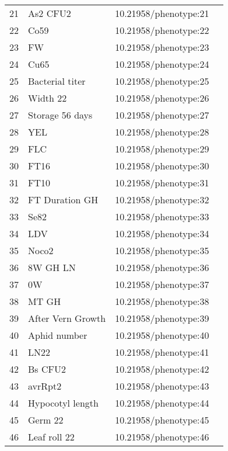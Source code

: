 \begin{longtable}{p{} p{} p{} p{}}
 21 & As2 CFU2 & 10.21958/phenotype:21 & \cite{atwell2010}\\
 22 & Co59 & 10.21958/phenotype:22 & \cite{atwell2010}\\
 23 & FW & 10.21958/phenotype:23 & \cite{atwell2010}\\
 24 & Cu65 & 10.21958/phenotype:24 & \cite{atwell2010}\\
 25 & Bacterial titer & 10.21958/phenotype:25 & \cite{atwell2010}\\
 26 & Width 22 & 10.21958/phenotype:26 & \cite{atwell2010}\\
 27 & Storage 56 days & 10.21958/phenotype:27 & \cite{atwell2010}\\
 28 & YEL & 10.21958/phenotype:28 & \cite{atwell2010}\\
 29 & FLC & 10.21958/phenotype:29 & \cite{atwell2010}\\
 30 & FT16 & 10.21958/phenotype:30 & \cite{atwell2010}\\
 31 & FT10 & 10.21958/phenotype:31 & \cite{atwell2010}\\
 32 & FT Duration GH & 10.21958/phenotype:32 & \cite{atwell2010}\\
 33 & Se82 & 10.21958/phenotype:33 & \cite{atwell2010}\\
 34 & LDV & 10.21958/phenotype:34 & \cite{atwell2010}\\
 35 & Noco2 & 10.21958/phenotype:35 & \cite{atwell2010}\\
 36 & 8W GH LN & 10.21958/phenotype:36 & \cite{atwell2010}\\
 37 & 0W & 10.21958/phenotype:37 & \cite{atwell2010}\\
 38 & MT GH & 10.21958/phenotype:38 & \cite{atwell2010}\\
 39 & After Vern Growth & 10.21958/phenotype:39 & \cite{atwell2010}\\
 40 & Aphid number & 10.21958/phenotype:40 & \cite{atwell2010}\\
 41 & LN22 & 10.21958/phenotype:41 & \cite{atwell2010}\\
 42 & Bs CFU2 & 10.21958/phenotype:42 & \cite{atwell2010}\\
 43 & avrRpt2 & 10.21958/phenotype:43 & \cite{atwell2010}\\
 44 & Hypocotyl length & 10.21958/phenotype:44 & \cite{atwell2010}\\
 45 & Germ 22 & 10.21958/phenotype:45 & \cite{atwell2010}\\
 46 & Leaf roll 22 & 10.21958/phenotype:46 & \cite{atwell2010}\\

\end{longtable}
